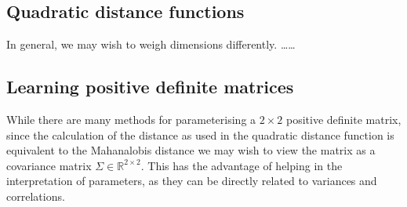 \documentclass[11pt]{article} %
\def\comment#1{\color{red}#1\color{black}}
\begin{document}
\subsection{Quadratic distance functions}
In general, we may wish to weigh dimensions differently. \comment{\ldots\ldots}


\subsection{Learning positive definite matrices}
While there are many methods for parameterising a $2\times2$ positive definite matrix, since the calculation of the distance as used in the quadratic distance function is equivalent to the Mahanalobis distance we may wish to view the matrix as a covariance matrix $\Sigma \in \mathbb{R}^{2\times2}$. This has the advantage of helping in the interpretation of parameters, as they can be directly related to variances and correlations.
\end{document}
